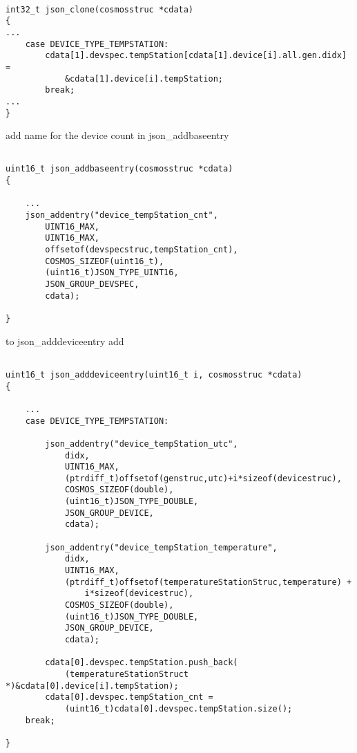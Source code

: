 \documentclass[10pt,letterpaper]{article}
\begin{document}
\begin{lstlisting}

int32_t json_clone(cosmosstruc *cdata)
{
...
	case DEVICE_TYPE_TEMPSTATION:
		cdata[1].devspec.tempStation[cdata[1].device[i].all.gen.didx] =
			&cdata[1].device[i].tempStation;
		break;
...
}

\end{lstlisting}

add name for the device count in json\_addbaseentry

\begin{lstlisting}

uint16_t json_addbaseentry(cosmosstruc *cdata)
{

	...
	json_addentry("device_tempStation_cnt", 
		UINT16_MAX, 
		UINT16_MAX,
		offsetof(devspecstruc,tempStation_cnt), 
		COSMOS_SIZEOF(uint16_t), 
		(uint16_t)JSON_TYPE_UINT16,
		JSON_GROUP_DEVSPEC,
		cdata);

}

\end{lstlisting}


to json\_adddeviceentry add 

\begin{lstlisting}

uint16_t json_adddeviceentry(uint16_t i, cosmosstruc *cdata)
{

	...
	case DEVICE_TYPE_TEMPSTATION:
	
		json_addentry("device_tempStation_utc",
			didx, 
			UINT16_MAX, 
			(ptrdiff_t)offsetof(genstruc,utc)+i*sizeof(devicestruc),
			COSMOS_SIZEOF(double), 
			(uint16_t)JSON_TYPE_DOUBLE,
			JSON_GROUP_DEVICE,
			cdata);

		json_addentry("device_tempStation_temperature",
			didx, 
			UINT16_MAX,
			(ptrdiff_t)offsetof(temperatureStationStruc,temperature) + 
				i*sizeof(devicestruc),
			COSMOS_SIZEOF(double), 
			(uint16_t)JSON_TYPE_DOUBLE,
			JSON_GROUP_DEVICE,
			cdata);
		
		cdata[0].devspec.tempStation.push_back(
			(temperatureStationStruct *)&cdata[0].device[i].tempStation);
		cdata[0].devspec.tempStation_cnt = 
			(uint16_t)cdata[0].devspec.tempStation.size();
	break;

}

\end{lstlisting}



\end{document}
